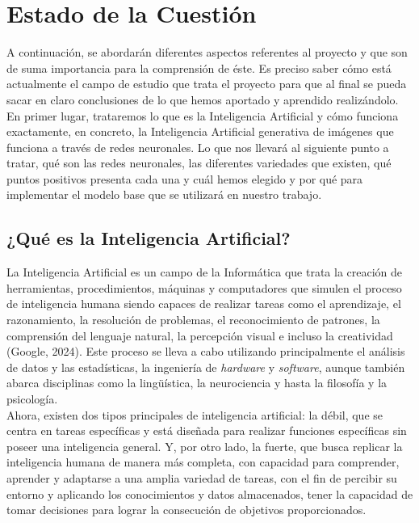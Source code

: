 \chapter{Estado de la Cuestión}
\label{cap:estadoDeLaCuestion}


A continuación, se abordarán diferentes aspectos referentes al proyecto y que son de suma importancia para la comprensión de éste. Es preciso saber cómo está actualmente el campo de estudio que trata el proyecto para que al final se pueda sacar en claro conclusiones de lo que hemos aportado y aprendido realizándolo.\\ 

En primer lugar, trataremos lo que es la Inteligencia Artificial y cómo funciona exactamente, en concreto, la Inteligencia Artificial generativa de imágenes que funciona a través de redes neuronales. Lo que nos llevará al siguiente punto a tratar, qué son las redes neuronales, las diferentes variedades que existen, qué puntos positivos presenta cada una y cuál hemos elegido y por qué para implementar el modelo base que se utilizará en nuestro trabajo. \\


\section{¿Qué es la Inteligencia Artificial?}

La Inteligencia Artificial es un campo de la Informática que trata la creación de herramientas, procedimientos, máquinas y computadores que simulen el proceso de inteligencia humana siendo capaces de realizar tareas como el aprendizaje, el razonamiento, la resolución de problemas, el reconocimiento de patrones, la comprensión del lenguaje natural, la percepción visual e incluso la creatividad (Google, 2024). Este proceso se lleva a cabo utilizando principalmente el análisis de datos y las estadísticas, la ingeniería de \textit{hardware} y \textit{software}, aunque también abarca disciplinas como la lingüística, la neurociencia y hasta la filosofía y la psicología.\\

Ahora, existen dos tipos principales de inteligencia artificial: la débil, que se centra en tareas específicas y está diseñada para realizar funciones específicas sin poseer una inteligencia general. Y, por otro lado, la fuerte, que busca replicar la inteligencia humana de manera más completa, con capacidad para comprender, aprender y adaptarse a una amplia variedad de tareas, con el fin de percibir su entorno y aplicando los conocimientos y datos almacenados, tener la capacidad de tomar decisiones para lograr la consecución de objetivos proporcionados.\\

